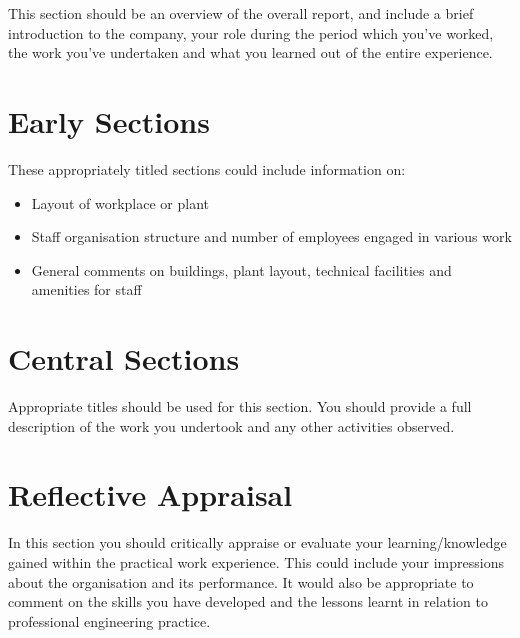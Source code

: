 \documentclass[pdftex, 12pt, a4paper, twoside]{article} %
\let\oldsection\section
\def\section{\clearpage\oldsection}
\begin{document}
This section should be an overview of the overall report, and include a brief introduction to the company, your role during the period which you've worked, the work you've undertaken and what you learned out of the entire experience.

\lipsum[1-2]

\section{Early Sections}
\label{sec:earlysections}

These appropriately titled sections could include information on:

\begin{itemize}
\item Layout of workplace or plant
\item Staff organisation structure and number of employees engaged in various work
\item General comments on buildings, plant layout, technical facilities and amenities for staff
\end{itemize}

\lipsum[1-2]

\section{Central Sections}
\label{sec:centralsections}

Appropriate titles should be used for this section. You should provide a full description of the work you undertook and any other activities observed.

\lipsum[1-2]

\section{Reflective Appraisal}
\label{sec:reflectiveappraisal}

In this section you should critically appraise or evaluate your learning/knowledge gained within the practical work experience. This could include your impressions about the organisation and its performance. It would also be appropriate to comment on the skills you have developed and the lessons learnt in relation to professional engineering practice.
\end{document}
